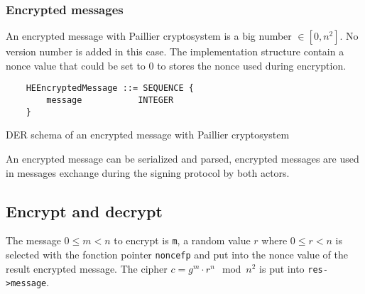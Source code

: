 \subsubsection{Encrypted messages}

An encrypted message with Paillier cryptosystem is a big number $\in [0, n^2]$.
No version number is added in this case.
The implementation structure contain a nonce value that could be set to 0
to stores the nonce used during encryption.

\begin{listing}
  \begin{verbatim}
    HEEncryptedMessage ::= SEQUENCE {
        message           INTEGER
    }
  \end{verbatim}
	\caption{DER schema of an encrypted message with Paillier cryptosystem}
	\label{lst:DERSchemaPaillierEncMessage}
\end{listing}

An encrypted message can be serialized and parsed, encrypted messages are used in
messages exchange during the signing protocol by both actors.

%

\subsection{Encrypt and decrypt}

The message $0 \leq m < n$ to encrypt is \texttt{m}, a random value $r$ where
$0 \leq r < n$ is selected with the fonction pointer \texttt{noncefp} and put into
the nonce value of the result encrypted message. The cipher
$c = g^m \cdot r^n \mod n^2$ is put into \texttt{res->message}.

